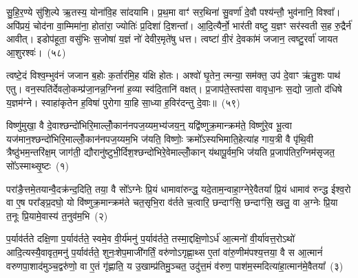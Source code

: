 सु॒हि॒र॒ण्ये सु॑शि॒ल्पे ऋ॒तस्य॒ योना॑वि॒ह सा॑दयामि। प्र॒थ॒मा वाꣳ॑ सर॒थिना॑ सु॒वर्णा॑ दे॒वौ पश्य॑न्तौ॒ भुव॑नानि॒ विश्वा᳚। अपि॑प्रयं॒ चोद॑ना वा॒म्मिमा॑ना॒ होता॑रा॒ ज्योतिः॑ प्र॒दिशा॑ दि॒शन्ता᳚। आ॒दि॒त्यैर्नो॒ भार॑ती वष्टु य॒ज्ञꣳ सर॑स्वती स॒ह रु॒द्रैर्न॑ आवीत्। इडोप॑हूता॒ वसु॑भिः स॒जोषा॑ य॒ज्ञं नो॑ देवीर॒मृते॑षु धत्त। त्वष्टा॑ वी॒रं दे॒वका॑मं जजान॒ त्वष्टु॒रर्वा॑ जायत आ॒शुरश्वः॑।~(५८)

त्वष्टे॒दं विश्व॒म्भुव॑नं जजान ब॒होः क॒र्तार॑मि॒ह य॑क्षि होतः। अश्वो॑ घृ॒तेन॒ त्मन्या॒ सम॑क्त॒ उप॑ दे॒वाꣳ ऋ॑तु॒शः पाथ॑ एतु। वन॒स्पति॑र्देवलो॒कम्प्र॑जा॒नन्न॒ग्निना॑ ह॒व्या स्व॑दि॒तानि॑ वक्षत्। प्र॒जाप॑ते॒स्तप॑सा वावृधा॒नः स॒द्यो जा॒तो द॑धिषे य॒ज्ञम॑ग्ने। स्वाहा॑कृतेन ह॒विषा॑ पुरोगा या॒हि सा॒ध्या ह॒विर॑दन्तु दे॒वाः॥~(५९)

{\anuvakamend[{अ॒ग्निष्ट्वा॑ वा॒मश्वो॒ द्विच॑त्वारिꣳशच्च}]}%


{\anuvakamend[{विष्णु॑मुखा॒ अन्न॑पते॒ याव॑ती॒ वि वै पु॑रुषमा॒त्रेणाग्ने॒ तव॒ श्रवो॒ ब्रह्म॑ जज्ञा॒नꣴ स्व॑यमातृ॒ण्णामे॒षां वै प॒शुर्गा॑य॒त्री कस्त्वा॒ द्वाद॑श}]}%

\setcounter{anuvakam}{0}
विष्णु॑मुखा॒ वै दे॒वाश्छन्दो॑भिरि॒माल्लोँ॒कान॑नपज॒य्यम॒भ्य॑जय॒न्॒ यद्वि॑ष्णुक्र॒मान्क्रम॑ते॒ विष्णु॑रे॒व भू॒त्वा यज॑मान॒श्छन्दो॑भिरि॒माल्लोँ॒कान॑नपज॒य्यम॒भि ज॑यति॒ विष्णोः॒ क्रमो᳚\-ऽस्यभिमाति॒हेत्या॑ह गाय॒त्री वै पृ॑थि॒वी त्रैष्ठु॑भम॒न्तरि॑क्ष॒म् जाग॑ती॒ द्यौरानु॑ष्टुभी॒र्दिश॒श्छन्दो॑भिरे॒वेमाल्लोँ॒कान् य॑थापू॒र्वम॒भि ज॑यति प्र॒जाप॑तिर॒ग्निम॑सृजत॒ सो᳚\-ऽस्माथ्सृ॒ष्टः~(१)

परा॑ङै॒त्तमे॒तयान्वै॒दक्र॑न्द॒दिति॒ तया॒ वै सो᳚\-ऽग्नेः प्रि॒यं धामावा॑रुन्द्ध॒ यदे॒ताम॒न्वाहा॒ग्नेरे॒वैतया᳚ प्रि॒यं धामाव॑ रुन्द्ध ईश्व॒रो वा ए॒ष परा᳚ङ्प्र॒दघो॒ यो वि॑ष्णुक्र॒मान्क्रम॑ते चत॒सृभि॒रा व॑र्तते च॒त्वारि॒ छन्दाꣳ॑सि॒ छन्दाꣳ॑सि॒ खलु॒ वा अ॒ग्नेः प्रि॒या त॒नूः प्रि॒यामे॒वास्य॑ त॒नुव॑म॒भि~(२)

प॒र्याव॑र्तते दक्षि॒णा प॒र्याव॑र्तते॒ स्वमे॒व वी॒र्य॑मनु॑ प॒र्याव॑र्तते॒ तस्मा॒द्दक्षि॒णो\-ऽर्ध॑ आ॒त्मनो॑ वी॒र्या॑वत्त॒रो\-ऽथो॑ आदि॒त्यस्यै॒वावृत॒मनु॑ प॒र्याव॑र्तते॒ शुनः॒शेप॒माजी॑गर्तिं॒ वरु॑णो\-ऽगृह्णा॒थ्स ए॒तां वा॑रु॒णीम॑पश्य॒त्तया॒ वै स आ॒त्मानं॑ वरुणपा॒शाद॑मुञ्च॒द्वरु॑णो॒ वा ए॒तं गृ॑ह्णाति॒ य उ॒खाम्प्र॑तिमु॒ञ्चत॒ उदु॑त्त॒मं व॑रुण॒ पाश॑म॒स्मदित्या॑हा॒त्मान॑मे॒वैतया᳚~(३)

